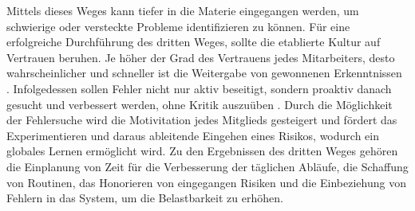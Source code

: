 Mittels dieses Weges kann tiefer in die Materie eingegangen werden, um schwierige oder versteckte Probleme identifizieren zu können. Für eine erfolgreiche Durchführung des dritten Weges, sollte die etablierte Kultur auf Vertrauen beruhen. Je höher der Grad des Vertrauens jedes Mitarbeiters, desto wahrscheinlicher und schneller ist die Weitergabe von gewonnenen Erkenntnissen \cite[S. 357]{kim_phoenix_2014}. Infolgedessen sollen Fehler nicht nur aktiv beseitigt, sondern proaktiv danach gesucht und verbessert werden, ohne Kritik auszuüben \cite[S. 255]{tiemeyer_handbuch_2021}. Durch die Möglichkeit der Fehlersuche wird die Motivitation jedes Mitglieds gesteigert und fördert das Experimentieren und daraus ableitende Eingehen eines Risikos, wodurch ein globales Lernen ermöglicht wird. Zu den Ergebnissen des dritten Weges gehören die Einplanung von Zeit für die Verbesserung der täglichen Abläufe, die Schaffung von Routinen, das Honorieren von eingegangen Risiken und die Einbeziehung von Fehlern in das System, um die Belastbarkeit zu erhöhen.


